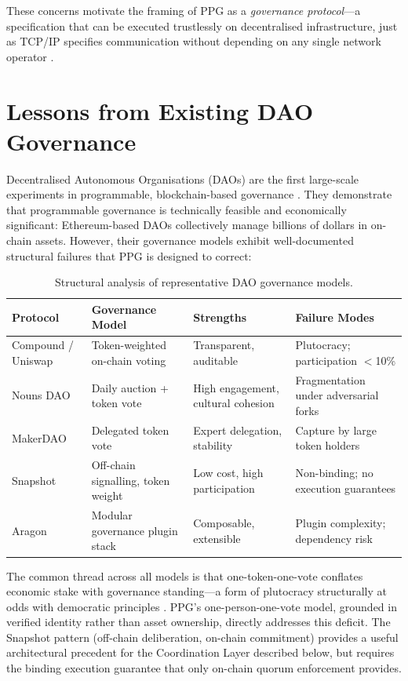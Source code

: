 \documentclass[12pt,a4paper,oneside]{report}
\begin{document}
These concerns motivate the framing of PPG as a \emph{governance protocol}---a specification that can be executed trustlessly on decentralised infrastructure, just as TCP/IP specifies communication without depending on any single network operator \citep{defilippi2018blockchain}.

\section{Lessons from Existing DAO Governance}

Decentralised Autonomous Organisations (DAOs) are the first large-scale experiments in programmable, blockchain-based governance \citep{hassan2021decentralized}. They demonstrate that programmable governance is technically feasible and economically significant: Ethereum-based DAOs collectively manage billions of dollars in on-chain assets. However, their governance models exhibit well-documented structural failures that PPG is designed to correct:

\begin{table}[htbp]
\centering
\caption{Structural analysis of representative DAO governance models.}
\begin{tabular}{@{} l p{2.6cm} p{2.7cm} p{3cm} @{}}
\toprule
\textbf{Protocol} & \textbf{Governance Model} & \textbf{Strengths} & \textbf{Failure Modes} \\
\midrule
Compound / Uniswap & Token-weighted on-chain voting & Transparent, auditable & Plutocracy; participation $<$10\% \\
Nouns DAO           & Daily auction + token vote & High engagement, cultural cohesion & Fragmentation under adversarial forks \\
MakerDAO            & Delegated token vote & Expert delegation, stability & Capture by large token holders \\
Snapshot            & Off-chain signalling, token weight & Low cost, high participation & Non-binding; no execution guarantees \\
Aragon              & Modular governance plugin stack & Composable, extensible & Plugin complexity; dependency risk \\
\bottomrule
\end{tabular}
\label{tab:dao}
\end{table}

The common thread across all models is that one-token-one-vote conflates economic stake with governance standing---a form of plutocracy structurally at odds with democratic principles \citep{buterin2022desoc, chohan2017dao}. PPG's one-person-one-vote model, grounded in verified identity rather than asset ownership, directly addresses this deficit. The Snapshot pattern (off-chain deliberation, on-chain commitment) provides a useful architectural precedent for the Coordination Layer described below, but requires the binding execution guarantee that only on-chain quorum enforcement provides.
\end{document}
